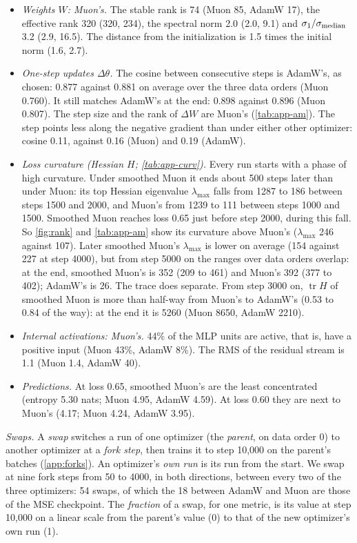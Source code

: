 \documentclass[10pt]{article}
\makeatletter
\renewcommand\paragraph{\@startsection{paragraph}{4}{\z@}{1.0ex \@plus .3ex \@minus .2ex}{-1em}{\normalfont\normalsize\bfseries}}
\makeatother
\begin{document}
\begin{itemize}
\item \emph{Weights $W$: Muon's.} The stable rank is 74 (Muon 85, AdamW 17), the effective rank 320 (320, 234), the
spectral norm 2.0 (2.0, 9.1) and $\sigma_1/\sigma_{\rm median}$ 3.2 (2.9, 16.5). The distance from the initialization
is 1.5 times the initial norm (1.6, 2.7).
\item \emph{One-step updates $\Delta\theta$.} The cosine between consecutive steps is AdamW's, as chosen: 0.877 against
0.881 on average over the three data orders (Muon 0.760). It still matches AdamW's at the end: 0.898 against 0.896
(Muon 0.807). The step size and the rank of
$\Delta W$ are Muon's (\cref{tab:app-am}). The step points less along the negative gradient than under either other
optimizer: cosine 0.11, against 0.16 (Muon) and 0.19 (AdamW).
\item \emph{Loss curvature (Hessian $H$; \cref{tab:app-curv}).} Every run starts with a phase of high curvature. Under
smoothed Muon it ends about 500 steps later than under Muon: its top Hessian eigenvalue $\lambda_{\max}$ falls from 1287
to 186 between steps 1500 and 2000, and Muon's from 1239 to 111 between steps 1000 and 1500. Smoothed Muon reaches loss
0.65 just before step 2000, during this fall. So \cref{fig:rank} and \cref{tab:app-am} show its curvature above Muon's
($\lambda_{\max}$ 246 against 107). Later smoothed Muon's $\lambda_{\max}$ is lower on average (154 against 227 at step 4000), but from step 5000 on
the ranges over data orders overlap: at the end, smoothed Muon's is 352 (209 to 461) and Muon's 392 (377 to 402);
AdamW's is 26. The trace does separate. From step 3000 on,
$\operatorname{tr}H$ of smoothed Muon is more than half-way from Muon's to AdamW's (0.53 to 0.84 of the way): at the
end it is 5260 (Muon 8650, AdamW 2210).
\item \emph{Internal activations: Muon's.} 44\% of the MLP units are active, that is, have a positive input (Muon
43\%, AdamW 8\%). The RMS of the residual stream is 1.1 (Muon 1.4, AdamW 40).
\item \emph{Predictions.} At loss 0.65, smoothed Muon's are the least concentrated (entropy 5.30 nats; Muon 4.95,
AdamW 4.59). At loss 0.60 they are next to Muon's (4.17; Muon 4.24, AdamW 3.95).
\end{itemize}

\paragraph{Step 3: swaps (\cref{fig:swap}).} \emph{Swaps.} A \emph{swap} switches a run of one optimizer (the
\emph{parent}, on data order 0) to another optimizer at a \emph{fork step}, then trains it to step 10{,}000 on the
parent's batches (\cref{app:forks}). An optimizer's \emph{own run} is its run from the start. We swap at nine fork steps
from 50 to 4000, in both directions, between every two of the three optimizers: 54 swaps, of which the 18 between
AdamW and Muon are those of the MSE checkpoint. The \emph{fraction} of a swap, for one metric, is its value at step
10{,}000 on a linear scale from the parent's value (0) to that of the new optimizer's own run (1).
\end{document}

